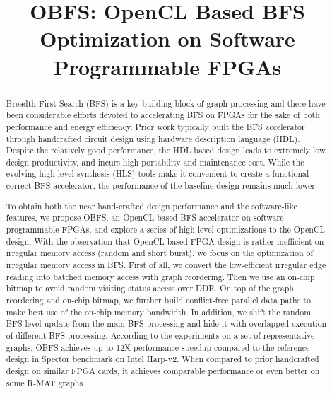 \documentclass[conference]{IEEEtran}
\begin{document}
%
\title{OBFS: OpenCL Based BFS Optimization on Software Programmable FPGAs}

\maketitle

\begin{abstract}
    Breadth First Search (BFS) is a key building block of graph processing 
	and there have been considerable efforts devoted to accelerating BFS on FPGAs
	for the sake of both performance and energy efficiency. Prior work 
	typically built the BFS accelerator through handcrafted circuit design using 
	hardware description language (HDL). Despite the relatively good performance, 
	the HDL based design leads to extremely low design productivity, and incurs 
	high portability and maintenance cost. While the evolving high level synthesis (HLS) 
	tools make it convenient to create a functional correct BFS accelerator, 
	the performance of the baseline design remains much lower. 

	To obtain both the near hand-crafted design performance and the software-like features, 
	we propose OBFS, an OpenCL based BFS accelerator on software programmable FPGAs, 
	and explore a series of high-level optimizations to the OpenCL design. 
	With the observation that OpenCL based FPGA design is rather inefficient on 
	irregular memory access (random and short burst), we focus on the optimization 
	of irregular memory access in BFS. 
	First of all, we convert the low-efficient irregular edge reading into batched 
	memory access with graph reordering. Then we use an on-chip bitmap to avoid random 
	visiting status access over DDR. On top of the graph reordering and 
	on-chip bitmap, we further build conflict-free parallel data paths 
	to make best use of the on-chip memory bandwidth. In addition, we 
	shift the random BFS level update from the main BFS processing and 
	hide it with overlapped execution of different BFS processing. 
	According to the experiments on a set of representative graphs, 
	OBFS achieves up to 12X performance speedup compared to the reference design 
	in Spector benchmark on Intel Harp-v2. When compared to prior handcrafted design on 
	similar FPGA cards, it achieves comparable performance or even better on some R-MAT graphs. 
\end{abstract}
\end{document}
